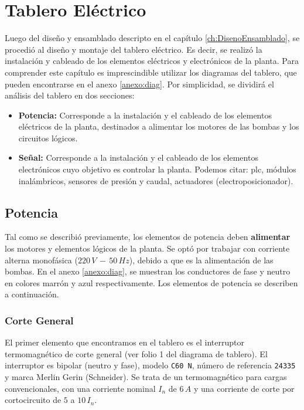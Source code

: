 \chapter{Tablero Eléctrico}
\label{ch:tablero}

Luego del diseño y ensamblado descripto en el capítulo
\ref{ch:DisenoEnsamblado}, se procedió al diseño y montaje del
tablero eléctrico.
Es decir, se realizó la instalación y cableado de los elementos eléctricos y
electrónicos de la planta.
Para comprender este capítulo es imprescindible utilizar los diagramas
del tablero, que pueden encontrarse en el anexo \ref{anexo:diag}.
Por simplicidad, se dividirá el análisis del tablero en dos secciones:
\begin{itemize}
 \item \textbf{Potencia:} Corresponde a la instalación y el cableado
 de los elementos eléctricos de la planta, destinados a alimentar los motores de 
 las bombas y los circuitos lógicos.
 \item \textbf{Señal:} Corresponde a la instalación y el cableado
 de los elementos electrónicos cuyo objetivo es controlar la planta.
 Podemos citar: \gls{plc}, módulos inalámbricos,
 sensores de presión y caudal, actuadores (electroposicionador).
\end{itemize}

\section{Potencia}
\label{sec:Potencia}
Tal como se describió previamente, los elementos de potencia deben
\textbf{alimentar} los motores y elementos lógicos de la planta.
Se optó por trabajar con corriente alterna monofásica ($220\,V\,-\,50\,Hz$),
debido a que es la alimentación de las bombas.
En el anexo \ref{anexo:diag}, se muestran los conductores de fase y neutro en
colores marrón y azul respectivamente.
Los elementos de potencia se describen a continuación.

\subsection{Corte General}
\label{subsec:corteGeneral}
El primer elemento que encontramos en el tablero es el interruptor
termomagnético de corte general (ver folio 1 del diagrama de tablero).
El interruptor es bipolar (neutro y fase), modelo \verb|C60 N|, número de
referencia \verb|24335| y marca Merlin Gerin (Schneider).
Se trata de un termomagnético para cargas convencionales, con una corriente
nominal $I_n$ de $6\,A$ y una corriente de corte por cortocircuito de $5$ a
$10\,I_n$.

